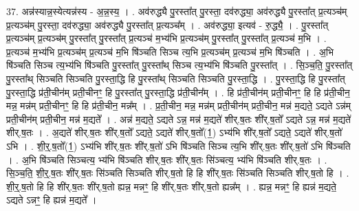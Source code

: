 \documentclass[17pt]{extarticle}
\begin{document}
37. अन्न॑स्यान्न॒स्येत्यन्न॑स्य - अ॒न्न॒स्य॒ । . अव॑रुद्ध्यै पु॒रस्ता᳚त् पु॒रस्ता॒ दव॑रुद्ध्या॒ अव॑रुद्ध्यै पु॒रस्ता᳚त् प्र॒त्यञ्च॑म् प्र॒त्यञ्च॑म् पु॒रस्ता॒ दव॑रुद्ध्या॒ अव॑रुद्ध्यै पु॒रस्ता᳚त् प्र॒त्यञ्च᳚म् । . अव॑रुद्ध्या॒ इत्यव॑ - रु॒द्ध्यै॒ । . पु॒रस्ता᳚त् प्र॒त्यञ्च॑म् प्र॒त्यञ्च॑म् पु॒रस्ता᳚त् पु॒रस्ता᳚त् प्र॒त्यञ्च॑ म॒भ्य॑भि प्र॒त्यञ्च॑म् पु॒रस्ता᳚त् पु॒रस्ता᳚त् प्र॒त्यञ्च॑ म॒भि । . प्र॒त्यञ्च॑ म॒भ्य॑भि प्र॒त्यञ्च॑म् प्र॒त्यञ्च॑ म॒भि षि॑ञ्चति सिञ्च त्य॒भि प्र॒त्यञ्च॑म् प्र॒त्यञ्च॑ म॒भि षि॑ञ्चति । . अ॒भि षि॑ञ्चति सिञ्च त्य॒भ्य॑भि षि॑ञ्चति पु॒रस्ता᳚त् पु॒रस्ता᳚थ् सिञ्च त्य॒भ्य॑भि षि॑ञ्चति पु॒रस्ता᳚त् । . सि॒ञ्च॒ति॒ पु॒रस्ता᳚त् पु॒रस्ता᳚थ् सिञ्चति सिञ्चति पु॒रस्ता॒द्धि हि पु॒रस्ता᳚थ् सिञ्चति सिञ्चति पु॒रस्ता॒द्धि । . पु॒रस्ता॒द्धि हि पु॒रस्ता᳚त् पु॒रस्ता॒द्धि प्र॑ती॒चीन॑म् प्रती॒चीनꣳ॒॒ हि पु॒रस्ता᳚त् पु॒रस्ता॒द्धि प्र॑ती॒चीन᳚म् । . हि प्र॑ती॒चीन॑म् प्रती॒चीनꣳ॒॒ हि हि प्र॑ती॒चीन॒ मन्न॒ मन्न॑म् प्रती॒चीनꣳ॒॒ हि हि प्र॑ती॒चीन॒ मन्न᳚म् । . प्र॒ती॒चीन॒ मन्न॒ मन्न॑म् प्रती॒चीन॑म् प्रती॒चीन॒ मन्न॑ म॒द्यते॒ ऽद्यते ऽन्न॑म् प्रती॒चीन॑म् प्रती॒चीन॒ मन्न॑ म॒द्यते᳚ । . अन्न॑ म॒द्यते॒ ऽद्यते ऽन्न॒ मन्न॑ म॒द्यते॑ शीर्.ष॒तः शी॑र्.ष॒तो᳚ ऽद्यते ऽन्न॒ मन्न॑ म॒द्यते॑ शीर्.ष॒तः । . अ॒द्यते॑ शीर्.ष॒तः शी॑र्.ष॒तो᳚ ऽद्यते॒ ऽद्यते॑ शीर्.ष॒तो᳚(1॒) ऽभ्य॑भि शी॑र्.ष॒तो᳚ ऽद्यते॒ ऽद्यते॑ शीर्.ष॒तो॑ ऽभि । . शी॒र्॒.ष॒तो᳚(1॒) ऽभ्य॑भि शी॑र्.ष॒तः शी॑र्.ष॒तो॑ ऽभि षि॑ञ्चति सिञ्च त्य॒भि शी॑र्.ष॒तः शी॑र्.ष॒तो॑ ऽभि षि॑ञ्चति । . अ॒भि षि॑ञ्चति सिञ्चत्य॒ भ्य॑भि षि॑ञ्चति शीर्.ष॒तः शी॑र्.ष॒तः सि॑ञ्चत्य॒ भ्य॑भि षि॑ञ्चति शीर्.ष॒तः । . सि॒ञ्च॒ति॒ शी॒र्॒.ष॒तः शी॑र्.ष॒तः सि॑ञ्चति सिञ्चति शीर्.ष॒तो हि हि शी॑र्.ष॒तः सि॑ञ्चति सिञ्चति शीर्.ष॒तो हि । . शी॒र्॒.ष॒तो हि हि शी॑र्.ष॒तः शी॑र्.ष॒तो ह्यन्न॒ मन्नꣳ॒॒ हि शी॑र्.ष॒तः शी॑र्.ष॒तो ह्यन्न᳚म् । . ह्यन्न॒ मन्नꣳ॒॒ हि ह्यन्न॑ म॒द्यते॒ ऽद्यते ऽन्नꣳ॒॒ हि ह्यन्न॑ म॒द्यते᳚ । \newline
\end{document}
